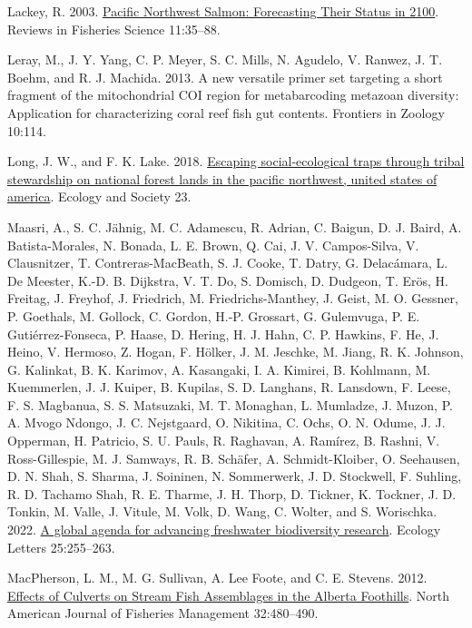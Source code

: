 \documentclass[
]{article}
\newlength{\cslhangindent}
\newlength{\cslentryspacingunit} %
\newenvironment{CSLReferences}[2] %
 {%
  \setlength{\parindent}{0pt}
  \ifodd #1
  \let\oldpar\par
  \def\par{\hangindent=\cslhangindent\oldpar}
  \fi
  \setlength{\parskip}{#2\cslentryspacingunit}
 }%
 {}
\begin{document}
\begin{CSLReferences}{1}{0}
\leavevmode{}%
Lackey, R. 2003.
\href{https://doi.org/10.1080/16226510390856529}{Pacific Northwest
Salmon: Forecasting Their Status in 2100}. Reviews in Fisheries Science
11:35--88.

\leavevmode{}%
Leray, M., J. Y. Yang, C. P. Meyer, S. C. Mills, N. Agudelo, V. Ranwez,
J. T. Boehm, and R. J. Machida. 2013. A new versatile primer set
targeting a short fragment of the mitochondrial COI region for
metabarcoding metazoan diversity: Application for characterizing coral
reef fish gut contents. Frontiers in Zoology 10:114.

\leavevmode{}%
Long, J. W., and F. K. Lake. 2018.
\href{https://www.jstor.org/stable/26799109}{Escaping social-ecological
traps through tribal stewardship on national forest lands in the pacific
northwest, united states of america}. Ecology and Society 23.

\leavevmode{}%
Maasri, A., S. C. Jähnig, M. C. Adamescu, R. Adrian, C. Baigun, D. J.
Baird, A. Batista-Morales, N. Bonada, L. E. Brown, Q. Cai, J. V.
Campos-Silva, V. Clausnitzer, T. Contreras-MacBeath, S. J. Cooke, T.
Datry, G. Delacámara, L. De Meester, K.-D. B. Dijkstra, V. T. Do, S.
Domisch, D. Dudgeon, T. Erös, H. Freitag, J. Freyhof, J. Friedrich, M.
Friedrichs-Manthey, J. Geist, M. O. Gessner, P. Goethals, M. Gollock, C.
Gordon, H.-P. Grossart, G. Gulemvuga, P. E. Gutiérrez-Fonseca, P. Haase,
D. Hering, H. J. Hahn, C. P. Hawkins, F. He, J. Heino, V. Hermoso, Z.
Hogan, F. Hölker, J. M. Jeschke, M. Jiang, R. K. Johnson, G. Kalinkat,
B. K. Karimov, A. Kasangaki, I. A. Kimirei, B. Kohlmann, M. Kuemmerlen,
J. J. Kuiper, B. Kupilas, S. D. Langhans, R. Lansdown, F. Leese, F. S.
Magbanua, S. S. Matsuzaki, M. T. Monaghan, L. Mumladze, J. Muzon, P. A.
Mvogo Ndongo, J. C. Nejstgaard, O. Nikitina, C. Ochs, O. N. Odume, J. J.
Opperman, H. Patricio, S. U. Pauls, R. Raghavan, A. Ramírez, B. Rashni,
V. Ross-Gillespie, M. J. Samways, R. B. Schäfer, A. Schmidt-Kloiber, O.
Seehausen, D. N. Shah, S. Sharma, J. Soininen, N. Sommerwerk, J. D.
Stockwell, F. Suhling, R. D. Tachamo Shah, R. E. Tharme, J. H. Thorp, D.
Tickner, K. Tockner, J. D. Tonkin, M. Valle, J. Vitule, M. Volk, D.
Wang, C. Wolter, and S. Worischka. 2022.
\href{https://doi.org/10.1111/ele.13931}{A global agenda for advancing
freshwater biodiversity research}. Ecology Letters 25:255--263.

\leavevmode{}%
MacPherson, L. M., M. G. Sullivan, A. Lee Foote, and C. E. Stevens.
2012. \href{https://doi.org/10.1080/02755947.2012.686004}{Effects of
Culverts on Stream Fish Assemblages in the Alberta Foothills}. North
American Journal of Fisheries Management 32:480--490.


\end{CSLReferences}
\end{document}
